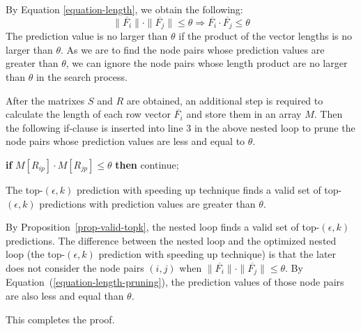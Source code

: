 By Equation \ref{equation-length}, we obtain the following:
\begin{equation}
\label{equation-length-pruning}
\|\overline{F_i} \| \cdot \| \overline{F_j} \| \leq \theta \Longrightarrow \overline{F_i} \cdot \overline{F_j} \leq \theta
\end{equation}
The prediction value is no larger than $\theta$ if the product of the vector lengths  is no larger than $\theta$.
As we are to find the node pairs whose prediction values are greater than $\theta$, we can ignore
the node pairs whose length product are no larger than $\theta$ in the search process. 

After  the matrixes $S$ and $R$ are obtained, an additional step is required to calculate the length of each row
vector $\overline{F_i}$ and store them in an array $M$. Then the following if-clause is inserted  into line 3
in the above nested loop to prune the node pairs whose prediction values are less and equal to $\theta$.
\begin{tabbing}\hspace{5ex}\=
{\bf if} $M[R_{ip}] \cdot M[R_{jp}] \leq \theta$ {\bf then} continue;
\end{tabbing}



\begin{prop}
The top-$(\epsilon, k)$ prediction with speeding up technique finds a valid set of top-$(\epsilon, k)$
predictions with prediction values are greater than $\theta$.
\end{prop}
\begin{IEEEproof}
By Proposition~\ref{prop-valid-topk}, the nested loop finds a valid set of
top-$(\epsilon, k)$ predictions. The difference between the nested loop
and the optimized nested loop (\ie the top-$(\epsilon, k)$ prediction with speeding up technique)
is that the later does not consider the node pairs $(i, j)$
when $\|\overline{F_i} \| \cdot \| \overline{F_j} \| \leq \theta$.
By Equation~(\ref{equation-length-pruning}), the prediction values of those node pairs
are also less and equal than $\theta$. 

This completes the proof.
\end{IEEEproof} 


